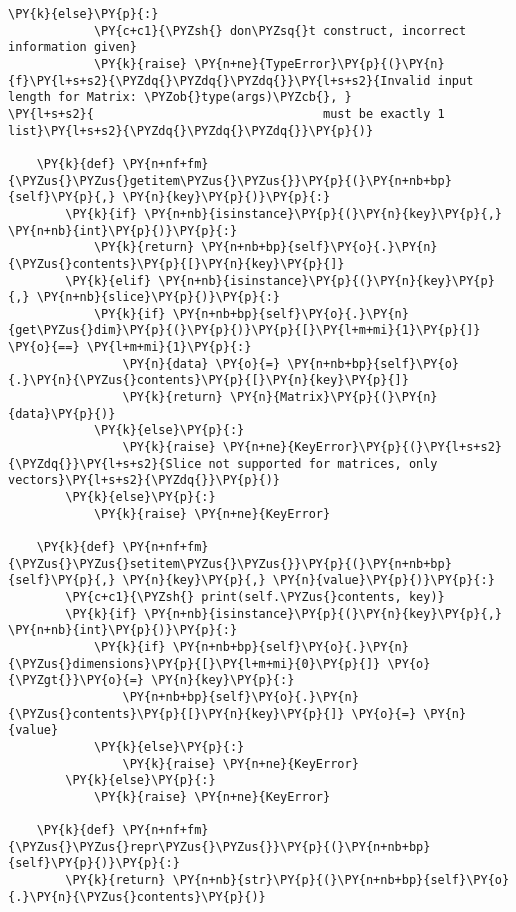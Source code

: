 \begin{Verbatim}[commandchars=\\\{\}]
        \PY{k}{else}\PY{p}{:}
            \PY{c+c1}{\PYZsh{} don\PYZsq{}t construct, incorrect information given}
            \PY{k}{raise} \PY{n+ne}{TypeError}\PY{p}{(}\PY{n}{f}\PY{l+s+s2}{\PYZdq{}\PYZdq{}\PYZdq{}}\PY{l+s+s2}{Invalid input length for Matrix: \PYZob{}type(args)\PYZcb{}, }
\PY{l+s+s2}{                                must be exactly 1 list}\PY{l+s+s2}{\PYZdq{}\PYZdq{}\PYZdq{}}\PY{p}{)}

    \PY{k}{def} \PY{n+nf+fm}{\PYZus{}\PYZus{}getitem\PYZus{}\PYZus{}}\PY{p}{(}\PY{n+nb+bp}{self}\PY{p}{,} \PY{n}{key}\PY{p}{)}\PY{p}{:}
        \PY{k}{if} \PY{n+nb}{isinstance}\PY{p}{(}\PY{n}{key}\PY{p}{,} \PY{n+nb}{int}\PY{p}{)}\PY{p}{:}
            \PY{k}{return} \PY{n+nb+bp}{self}\PY{o}{.}\PY{n}{\PYZus{}contents}\PY{p}{[}\PY{n}{key}\PY{p}{]}
        \PY{k}{elif} \PY{n+nb}{isinstance}\PY{p}{(}\PY{n}{key}\PY{p}{,} \PY{n+nb}{slice}\PY{p}{)}\PY{p}{:}
            \PY{k}{if} \PY{n+nb+bp}{self}\PY{o}{.}\PY{n}{get\PYZus{}dim}\PY{p}{(}\PY{p}{)}\PY{p}{[}\PY{l+m+mi}{1}\PY{p}{]} \PY{o}{==} \PY{l+m+mi}{1}\PY{p}{:}
                \PY{n}{data} \PY{o}{=} \PY{n+nb+bp}{self}\PY{o}{.}\PY{n}{\PYZus{}contents}\PY{p}{[}\PY{n}{key}\PY{p}{]}
                \PY{k}{return} \PY{n}{Matrix}\PY{p}{(}\PY{n}{data}\PY{p}{)}
            \PY{k}{else}\PY{p}{:}
                \PY{k}{raise} \PY{n+ne}{KeyError}\PY{p}{(}\PY{l+s+s2}{\PYZdq{}}\PY{l+s+s2}{Slice not supported for matrices, only vectors}\PY{l+s+s2}{\PYZdq{}}\PY{p}{)}
        \PY{k}{else}\PY{p}{:}
            \PY{k}{raise} \PY{n+ne}{KeyError}

    \PY{k}{def} \PY{n+nf+fm}{\PYZus{}\PYZus{}setitem\PYZus{}\PYZus{}}\PY{p}{(}\PY{n+nb+bp}{self}\PY{p}{,} \PY{n}{key}\PY{p}{,} \PY{n}{value}\PY{p}{)}\PY{p}{:}
        \PY{c+c1}{\PYZsh{} print(self.\PYZus{}contents, key)}
        \PY{k}{if} \PY{n+nb}{isinstance}\PY{p}{(}\PY{n}{key}\PY{p}{,} \PY{n+nb}{int}\PY{p}{)}\PY{p}{:}
            \PY{k}{if} \PY{n+nb+bp}{self}\PY{o}{.}\PY{n}{\PYZus{}dimensions}\PY{p}{[}\PY{l+m+mi}{0}\PY{p}{]} \PY{o}{\PYZgt{}}\PY{o}{=} \PY{n}{key}\PY{p}{:}
                \PY{n+nb+bp}{self}\PY{o}{.}\PY{n}{\PYZus{}contents}\PY{p}{[}\PY{n}{key}\PY{p}{]} \PY{o}{=} \PY{n}{value}
            \PY{k}{else}\PY{p}{:}
                \PY{k}{raise} \PY{n+ne}{KeyError}
        \PY{k}{else}\PY{p}{:}
            \PY{k}{raise} \PY{n+ne}{KeyError}

    \PY{k}{def} \PY{n+nf+fm}{\PYZus{}\PYZus{}repr\PYZus{}\PYZus{}}\PY{p}{(}\PY{n+nb+bp}{self}\PY{p}{)}\PY{p}{:}
        \PY{k}{return} \PY{n+nb}{str}\PY{p}{(}\PY{n+nb+bp}{self}\PY{o}{.}\PY{n}{\PYZus{}contents}\PY{p}{)}


\end{Verbatim}
